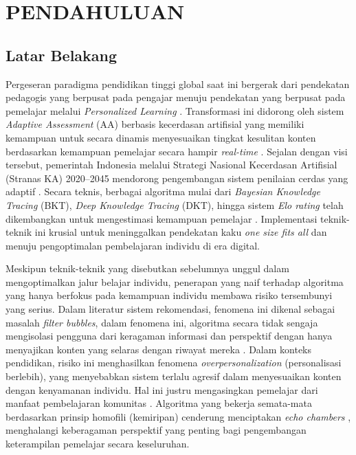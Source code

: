 \cleardoublepage %
\chapter{PENDAHULUAN}
\label{chap:pendahuluan}
\section{Latar Belakang}
\label{sec:latar_belakang}

Pergeseran paradigma pendidikan tinggi global saat ini bergerak dari
pendekatan pedagogis yang berpusat pada pengajar menuju pendekatan yang berpusat
pada pemelajar melalui \textit{Personalized Learning} \autocite{Ryoo2021}. Transformasi
ini didorong oleh sistem \textit{Adaptive Assessment} (AA) berbasis kecerdasan
artifisial yang memiliki kemampuan untuk secara dinamis menyesuaikan tingkat kesulitan konten berdasarkan kemampuan pemelajar secara hampir \textit{real-time} \autocite{Halkiopoulos2024}. Sejalan dengan visi tersebut, pemerintah Indonesia melalui Strategi Nasional Kecerdasan
Artifisial (Stranas KA) 2020--2045 mendorong pengembangan sistem
penilaian cerdas yang adaptif \autocite{BPPT2020}. Secara teknis, berbagai algoritma
mulai dari \textit{Bayesian Knowledge Tracing} (BKT), \textit{Deep Knowledge Tracing}
(DKT), hingga sistem \textit{Elo rating} telah dikembangkan untuk mengestimasi
kemampuan pemelajar \autocite{Minn2022, Vesin2022}. Implementasi teknik-teknik ini krusial untuk meninggalkan pendekatan kaku \textit{one size fits all}
dan menuju pengoptimalan pembelajaran individu di era digital.

Meskipun teknik-teknik yang disebutkan sebelumnya unggul dalam mengoptimalkan jalur
belajar individu, penerapan yang naif terhadap algoritma yang hanya berfokus
pada kemampuan individu membawa risiko tersembunyi yang serius. Dalam
literatur sistem rekomendasi, fenomena ini dikenal sebagai masalah
\textit{filter bubbles}, dalam fenomena ini, algoritma secara tidak sengaja
mengisolasi
pengguna dari keragaman informasi dan perspektif dengan hanya menyajikan konten
yang selaras dengan riwayat mereka \autocite{Wang2022}. Dalam konteks pendidikan,
risiko ini menghasilkan fenomena \textit{overpersonalization} (personalisasi
berlebih), yang menyebabkan sistem terlalu agresif dalam menyesuaikan konten dengan
kenyamanan individu. Hal ini justru mengasingkan pemelajar dari manfaat pembelajaran komunitas
\autocite{Halkiopoulos2024}. Algoritma yang bekerja semata-mata berdasarkan
prinsip homofili (kemiripan) cenderung menciptakan \textit{echo chambers} \autocite{Tommasel2021}, menghalangi keberagaman perspektif yang penting bagi
pengembangan keterampilan pemelajar secara keseluruhan.

